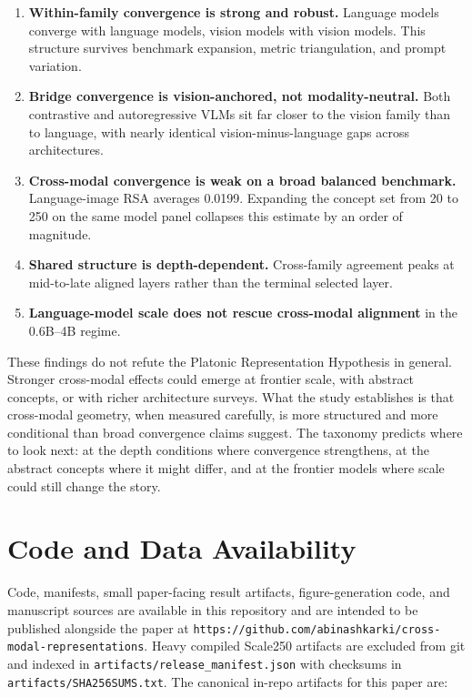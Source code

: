 \documentclass[11pt,a4paper]{article}
\providecommand{\tightlist}{%
  \setlength{\itemsep}{0pt}\setlength{\parskip}{0pt}}
\begin{document}
\begin{enumerate}
\def\labelenumi{\arabic{enumi}.}
\tightlist
\item
  \textbf{Within-family convergence is strong and robust.} Language
  models converge with language models, vision models with vision
  models. This structure survives benchmark expansion, metric
  triangulation, and prompt variation.
\item
  \textbf{Bridge convergence is vision-anchored, not modality-neutral.}
  Both contrastive and autoregressive VLMs sit far closer to the vision
  family than to language, with nearly identical vision-minus-language
  gaps across architectures.
\item
  \textbf{Cross-modal convergence is weak on a broad balanced
  benchmark.} Language-image RSA averages 0.0199. Expanding the concept
  set from 20 to 250 on the same model panel collapses this estimate by
  an order of magnitude.
\item
  \textbf{Shared structure is depth-dependent.} Cross-family agreement
  peaks at mid-to-late aligned layers rather than the terminal selected
  layer.
\item
  \textbf{Language-model scale does not rescue cross-modal alignment} in
  the 0.6B--4B regime.
\end{enumerate}

These findings do not refute the Platonic Representation Hypothesis in
general. Stronger cross-modal effects could emerge at frontier scale,
with abstract concepts, or with richer architecture surveys. What the
study establishes is that cross-modal geometry, when measured carefully,
is more structured and more conditional than broad convergence claims
suggest. The taxonomy predicts where to look next: at the depth
conditions where convergence strengthens, at the abstract concepts where
it might differ, and at the frontier models where scale could still
change the story.

\section{Code and Data Availability}\label{code-and-data-availability}

Code, manifests, small paper-facing result artifacts, figure-generation
code, and manuscript sources are available in this repository and are
intended to be published alongside the paper at
\texttt{https://github.com/abinashkarki/cross-modal-representations}.
Heavy compiled Scale250 artifacts are excluded from git and indexed in
\texttt{artifacts/release\_manifest.json} with checksums in
\texttt{artifacts/SHA256SUMS.txt}. The canonical in-repo artifacts for
this paper are:
\end{document}
